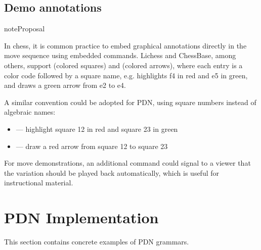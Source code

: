 \documentclass[letterpaper,10pt,english]{sphinxmanual}
\begin{document}
\section{Demo annotations}
\label{\detokenize{future:demo-annotations}}
\begin{sphinxadmonition}{note}{Proposal}

\sphinxAtStartPar
In chess, it is common practice to embed graphical annotations directly in the move sequence using
embedded commands. Lichess and ChessBase, among others, support \sphinxcode{\sphinxupquote{{[}\%csl ...{]}}} (colored squares)
and \sphinxcode{\sphinxupquote{{[}\%cal ...{]}}} (colored arrows), where each entry is a color code followed by a square
name, e.g. \sphinxcode{\sphinxupquote{{[}\%csl Rf4,Ge5{]}}} highlights f4 in red and e5 in green, and \sphinxcode{\sphinxupquote{{[}\%cal Ge2e4{]}}} draws
a green arrow from e2 to e4.

\sphinxAtStartPar
A similar convention could be adopted for PDN, using square numbers instead of algebraic names:
\begin{itemize}
\item {} 
\sphinxAtStartPar
\sphinxcode{\sphinxupquote{{[}\%csl R12,G23{]}}} — highlight square 12 in red and square 23 in green

\item {} 
\sphinxAtStartPar
{} — draw a red arrow from square 12 to square 23

\end{itemize}

\sphinxAtStartPar
For move demonstrations, an additional \sphinxcode{\sphinxupquote{{[}\%animate{]}}} command could signal to a viewer that
the variation should be played back automatically, which is useful for instructional material.
\end{sphinxadmonition}

\sphinxstepscope


\chapter{PDN Implementation}
\label{\detokenize{implementation:pdn-implementation}}\label{\detokenize{implementation:implementation-section}}\label{\detokenize{implementation::doc}}
\sphinxAtStartPar
This section contains concrete examples of PDN grammars.
\end{document}
